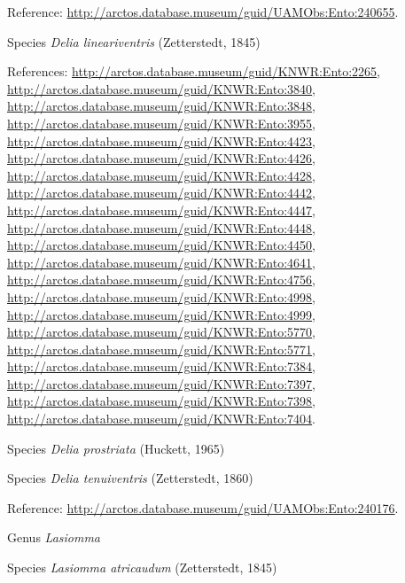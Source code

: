 \documentclass[9pt, article]{memoir}
\begin{document}
\begin{multicols}{2}
\vspace{6pt}Reference: 
\url{http://arctos.database.museum/guid/UAMObs:Ento:240655}.

\vspace{6pt}\noindent\hspace{36pt}Species \textit{Delia lineariventris} (Zetterstedt, 1845)


\vspace{6pt}References: 
\url{http://arctos.database.museum/guid/KNWR:Ento:2265}, 
\url{http://arctos.database.museum/guid/KNWR:Ento:3840}, 
\url{http://arctos.database.museum/guid/KNWR:Ento:3848}, 
\url{http://arctos.database.museum/guid/KNWR:Ento:3955}, 
\url{http://arctos.database.museum/guid/KNWR:Ento:4423}, 
\url{http://arctos.database.museum/guid/KNWR:Ento:4426}, 
\url{http://arctos.database.museum/guid/KNWR:Ento:4428}, 
\url{http://arctos.database.museum/guid/KNWR:Ento:4442}, 
\url{http://arctos.database.museum/guid/KNWR:Ento:4447}, 
\url{http://arctos.database.museum/guid/KNWR:Ento:4448}, 
\url{http://arctos.database.museum/guid/KNWR:Ento:4450}, 
\url{http://arctos.database.museum/guid/KNWR:Ento:4641}, 
\url{http://arctos.database.museum/guid/KNWR:Ento:4756}, 
\url{http://arctos.database.museum/guid/KNWR:Ento:4998}, 
\url{http://arctos.database.museum/guid/KNWR:Ento:4999}, 
\url{http://arctos.database.museum/guid/KNWR:Ento:5770}, 
\url{http://arctos.database.museum/guid/KNWR:Ento:5771}, 
\url{http://arctos.database.museum/guid/KNWR:Ento:7384}, 
\url{http://arctos.database.museum/guid/KNWR:Ento:7397}, 
\url{http://arctos.database.museum/guid/KNWR:Ento:7398}, 
\url{http://arctos.database.museum/guid/KNWR:Ento:7404}.

\vspace{6pt}\noindent\hspace{36pt}Species \textit{Delia prostriata} (Huckett, 1965)


\vspace{6pt}\noindent\hspace{36pt}Species \textit{Delia tenuiventris} (Zetterstedt, 1860)


\vspace{6pt}Reference: 
\url{http://arctos.database.museum/guid/UAMObs:Ento:240176}.

\vspace{6pt}\noindent\hspace{30pt}Genus \textit{Lasiomma}


\vspace{6pt}\noindent\hspace{36pt}Species \textit{Lasiomma atricaudum} (Zetterstedt, 1845)



\end{multicols}
\end{document}
